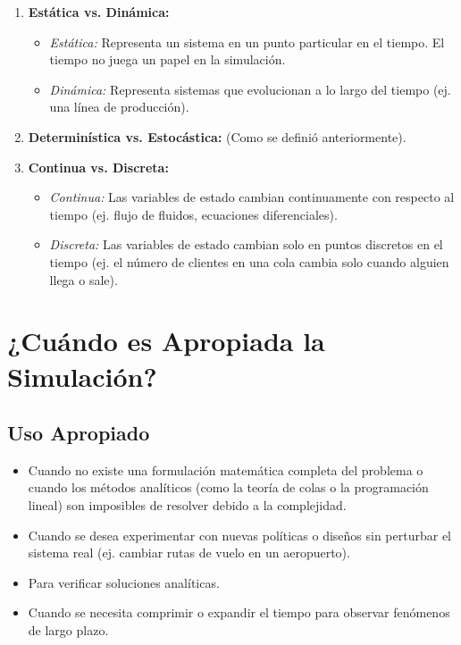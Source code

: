 \documentclass[11pt, letterpaper]{article}
\begin{document}
\begin{enumerate}
    \item \textbf{Estática vs. Dinámica:}
    \begin{itemize}
        \item \textit{Estática:} Representa un sistema en un punto particular en el tiempo. El tiempo no juega un papel en la simulación.
        \item \textit{Dinámica:} Representa sistemas que evolucionan a lo largo del tiempo (ej. una línea de producción).
    \end{itemize}
    
    \item \textbf{Determinística vs. Estocástica:} (Como se definió anteriormente).
    
    \item \textbf{Continua vs. Discreta:}
    \begin{itemize}
        \item \textit{Continua:} Las variables de estado cambian continuamente con respecto al tiempo (ej. flujo de fluidos, ecuaciones diferenciales).
        \item \textit{Discreta:} Las variables de estado cambian solo en puntos discretos en el tiempo (ej. el número de clientes en una cola cambia solo cuando alguien llega o sale).
    \end{itemize}
\end{enumerate}

\section{¿Cuándo es Apropiada la Simulación?}

\subsection{Uso Apropiado}
\begin{itemize}
    \item Cuando no existe una formulación matemática completa del problema o cuando los métodos analíticos (como la teoría de colas o la programación lineal) son imposibles de resolver debido a la complejidad.
    \item Cuando se desea experimentar con nuevas políticas o diseños sin perturbar el sistema real (ej. cambiar rutas de vuelo en un aeropuerto).
    \item Para verificar soluciones analíticas.
    \item Cuando se necesita comprimir o expandir el tiempo para observar fenómenos de largo plazo.
\end{itemize}
\end{document}
